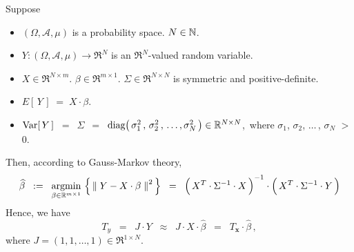 \vskip 0.5cm
\begin{remark}
\mbox{}
\vskip 0.05cm
\noindent
Suppose
\begin{itemize}
\item
	$(\Omega,\mathcal{A},\mu)$ is a probability space.
	$N \in \mathbb{N}$.
\item
	$Y : (\Omega,\mathcal{A},\mu) \longrightarrow \Re^{N}$ is an $\Re^{N}$-valued random variable.
\item
	$X \in \Re^{N \times m}$.\;
	$\beta \in \Re^{m \times 1}$.\;
	$\Sigma \in \Re^{N \times N}$ is symmetric and positive-definite.
\item
	$E\!\left[\,Y\,\right] \; = \; X \cdot \beta$.
\item
	$\textnormal{Var}\!\left[\,Y\,\right]$
	\,$=$\, $\Sigma$
	\,$=$\, $\textnormal{diag}\!\left(\,\sigma_{1}^{2}\,,\,\sigma_{2}^{2}\,,\,\ldots,\sigma_{N}^{2}\,\right) \in \mathbb{R}^{N \times N}$,\,
	where $\sigma_{1}$, $\sigma_{2}$, $\ldots$\,, $\sigma_{N}$ $>$ $0$.
\end{itemize}
Then, according to Gauss-Markov theory,
\begin{equation*}
\widehat{\beta}
\;\; := \;\;
	\underset{\beta\in\Re^{m \times 1}}{\textnormal{argmin}}\,
	\left\{\,
		\left\Vert\;Y - X \cdot \beta\;\right\Vert^{2}
	\,\right\}
\;\; = \;\;
	\left(\,X^{T} \overset{{\color{white}!}}{\cdot} \Sigma^{-1} \cdot X\,\right)^{-1}
	\cdot
	\left(\,X^{T} \overset{{\color{white}!}}{\cdot} \Sigma^{-1} \cdot Y \,\right)
\end{equation*}
Hence, we have
\begin{equation}\label{TyEqTxBetaHat}
T_{y}
\;\; = \;\; J \cdot Y
\;\; \approx \;\; J \cdot X \cdot \widehat{\beta}
\;\; = \;\; T_{\mathbf{x}} \cdot \widehat{\beta}\,,
\end{equation}
where $J = (1,1,\ldots,1) \in \Re^{1 \times N}$.


\end{remark}
